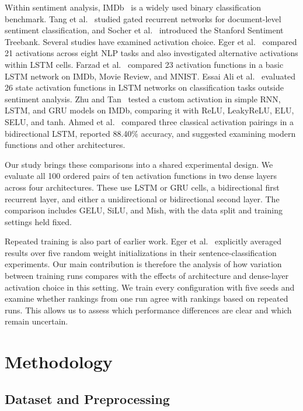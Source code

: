 \documentclass[conference,a4paper]{IEEEtran}
\begin{document}
Within sentiment analysis, IMDb~\cite{maas2011} is a widely
used binary classification benchmark. Tang et
al.~\cite{tang2015} studied gated recurrent networks for
document-level sentiment classification, and Socher et
al.~\cite{socher2013} introduced the Stanford Sentiment
Treebank. Several studies have examined activation choice.
Eger et al.~\cite{eger2018} compared 21 activations across
eight NLP tasks and also investigated alternative
activations within LSTM cells. Farzad et
al.~\cite{farzad2019} compared 23 activation functions in
a basic LSTM network on IMDb, Movie Review, and MNIST.
Essai Ali et al.~\cite{essaiAli2022} evaluated 26 state
activation functions in LSTM networks on classification
tasks outside sentiment analysis. Zhu and
Tan~\cite{zhu2022} tested a custom activation in simple RNN,
LSTM, and GRU models on IMDb, comparing it with ReLU,
LeakyReLU, ELU, SELU, and tanh. Ahmed et
al.~\cite{ahmed2025} compared three classical activation
pairings in a bidirectional LSTM, reported 88.40\% accuracy,
and suggested examining modern functions and other
architectures.

Our study brings these comparisons into a shared experimental
design. We evaluate all 100 ordered pairs of ten activation
functions in two dense layers across four architectures.
These use LSTM or GRU cells, a bidirectional first recurrent
layer, and either a unidirectional or bidirectional second
layer. The comparison includes GELU, SiLU, and Mish, with
the data split and training settings held fixed.

Repeated training is also part of earlier work. Eger et
al.~\cite{eger2018} explicitly averaged results over five
random weight initializations in their sentence-classification
experiments. Our main contribution is therefore the analysis
of how variation between training runs compares with the
effects of architecture and dense-layer activation choice
in this setting. We train every configuration with five
seeds and examine whether rankings from one run agree with
rankings based on repeated runs. This allows us to assess
which performance differences are clear and which remain
uncertain.%
\FloatBarrier
\section{Methodology}
\subsection{Dataset and Preprocessing}
\end{document}
